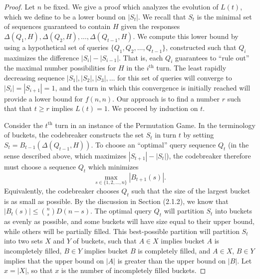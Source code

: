\documentclass[12pt, a4paper]{article}
\newcommand{\nth}{^{\text{th}}}       %
\begin{document}
	\begin{proof}
		 Let $n$ be fixed. We give a proof which analyzes the evolution of $L(t)$, which we define to be a lower bound on $|S_t|$. We recall that $S_t$ is the minimal set of sequences guaranteed to contain $H$ given the responses $\Delta(Q_1, H), \Delta(Q_2, H), \ldots, \Delta(Q_{t-1}, H)$. We compute this lower bound by using a hypothetical set of queries $\{Q_1, Q_2, \ldots, Q_{t-1}\}$, constructed such that $Q_i$ maximizes the difference $|S_{i}| - |S_{i-1}|$. That is, each $Q_i$ guarantees to ``rule out'' the maximal number possibilities for $H$ in the $i\nth$ turn. The least rapidly decreasing sequence $|S_1|, |S_2|, |S_3|, \ldots$ for this set of queries will converge to $|S_i| = |S_{i+1}| = 1$, and the turn in which this convergence is initially reached will provide a lower bound for $f(n, n)$. Our approach is to find a number $r$ such that that $t\ge r$ implies $L(t) = 1$. We proceed by induction on $t$.
		 
		 Consider the $t\nth$ turn in an instance of the Permutation Game. In the terminology of buckets, the codebreaker constructs the set $S_t$ in turn $t$ by setting $S_t = B_{t-1}(\Delta(Q_{t-1}, H))$. To choose an ``optimal'' query sequence $Q_t$ (in the sense described above, which maximizes $|S_{t+1}| - |S_{t}|$), the codebreaker therefore must choose a sequence $Q_t$ which minimizes
		 \begin{equation*}
			\max_{s\in\{1,2,\ldots,n\}}|B_{t+1}(s)|.
		 \end{equation*}
		 Equivalently, the codebreaker chooses $Q_t$ such that the size of the largest bucket is as small as possible. By the discussion in Section (2.1.2), we know that $|B_t(s)|\le\binom{n}{s}D(n-s)$. The optimal query $Q_t$ will partition $S_t$ into buckets as evenly as possible, and some buckets will have size equal to their upper bound, while others will be partially filled. This best-possible partition will partition $S_t$ into two sets $X$ and $Y$ of buckets, such that $A\in X$ implies bucket $A$ is incompletely filled, $B\in Y$ implies bucket $B$ is completely filled, and $A\in X$, $B\in Y$ implies that the upper bound on $|A|$ is greater than the upper bound on $|B|$. Let $x = |X|$, so that $x$ is the number of incompletely filled buckets.
		 

\end{proof}
\end{document}
